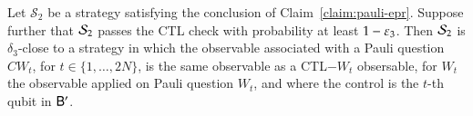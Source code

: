 %


\begin{claim}\label{claim:pauli-ctl}
Let $\mathcal{S}_2$ be a strategy satisfying the conclusion of Claim~\ref{claim:pauli-epr}. Suppose further that $\mathcal{S}_2$ passes the CTL check with probability at least $1-\varepsilon_3$. Then $\mathcal{S}_2$ is $\delta_3$-close to a strategy in which the observable associated with a Pauli question $CW_t$, for $t\in\{1,\ldots,2N\}$, is the same observable as a CTL$-W_t$ obsersable, for $W_t$ the observable applied on Pauli question $W_t$, and where the control is the $t$-th qubit in ${\mathsf{B}}'$. 
\end{claim}

